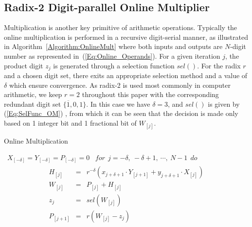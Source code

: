 \documentclass{acm_proc_article-sp}
\begin{document}
\subsection{Radix-2 Digit-parallel Online Multiplier}\label{subsec:OnlineMultiplier}
Multiplication is another key primitive of arithmetic operations. Typically the online multiplication is performed in a recursive digit-serial manner, as illustrated in Algorithm~\ref{Algorithm:OnlineMult} where both inputs and outputs are $N$-digit number as represented in~(\ref{Eq:Online_Operands}). For a given iteration $j$, the product digit $z_j$ is generated through a selection function $sel()$. For the radix $r$ and a chosen digit set, there exits an appropriate selection method and a value of $\delta$ which ensure convergence. As radix-2 is used most commonly in computer arithmetic, we keep $r=2$ throughout this paper with the corresponding redundant digit set $\{\overline{1},0,1\}$. In this case we have $\delta=3$, and $sel()$ is given by (\ref{Eq:SelFunc_OM}) \cite{Oregon_OnlineNetwork}, from which it can be seen that the decision is made only based on 1 integer bit and 1 fractional bit of $W_{[j]}$.

\begin{algorithm}[tbp]
  \caption{Online Multiplication}
  \begin{algorithmic}[1]
    \REQUIRE~$X_{[-\delta]}=Y_{[-\delta]}=P_{[-\delta]}=0$
    \ENSURE~$for~~ j=-\delta,~-\delta+1,~\cdots,~N-1 ~~do$
      \begin{eqnarray}\label{Eq:OnlineMult_General}
        \begin{matrix}
          H_{[j]}   & = & r^{-\delta}\left(x_{j+\delta+1}\cdot Y_{[j+1]}+y_{j+\delta+1}\cdot X_{[j]}\right)\\
          W_{[j]}   & = & P_{[j]} + H_{[j]}\\
          z_j       & = & sel(W_{[j]})\\
          P_{[j+1]} & = & r\left(W_{[j]}-z_j\right)
        \end{matrix}
      \end{eqnarray}
  \label{Algorithm:OnlineMult}
  \vspace{-2ex}
  \end{algorithmic}
\end{algorithm}
\vspace{-2ex}
\end{document}

